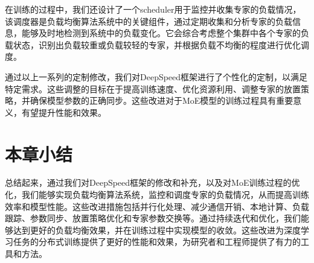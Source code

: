 在训练的过程中，我们还设计了一个scheduler用于监控并收集专家的负载情况，该调度器是负载均衡算法系统中的关键组件，通过定期收集和分析专家的负载信息，能够及时地检测到系统中的负载变化。它会综合考虑整个集群中各个专家的负载状态，识别出负载较重或负载较轻的专家，并根据负载不均衡的程度进行优化调度。

通过以上一系列的定制修改，我们对DeepSpeed框架进行了个性化的定制，以满足特定需求。这些调整的目标在于提高训练速度、优化资源利用、调整专家的放置策略，并确保模型参数的正确同步。这些改进对于MoE模型的训练过程具有重要意义，有望提升性能和效果。

\section{本章小结}

总结起来，通过我们对DeepSpeed框架的修改和补充，以及对MoE训练过程的优化，我们能够实现负载均衡算法系统，监控和调度专家的负载情况，从而提高训练效率和模型性能。这些改进措施包括并行化处理、减少通信开销、本地计算、负载跟踪、参数同步、放置策略优化和专家参数交换等。通过持续迭代和优化，我们能够达到更好的负载均衡效果，并在训练过程中实现模型的收敛。这些改进为深度学习任务的分布式训练提供了更好的性能和效果，为研究者和工程师提供了有力的工具和方法。

\endinput